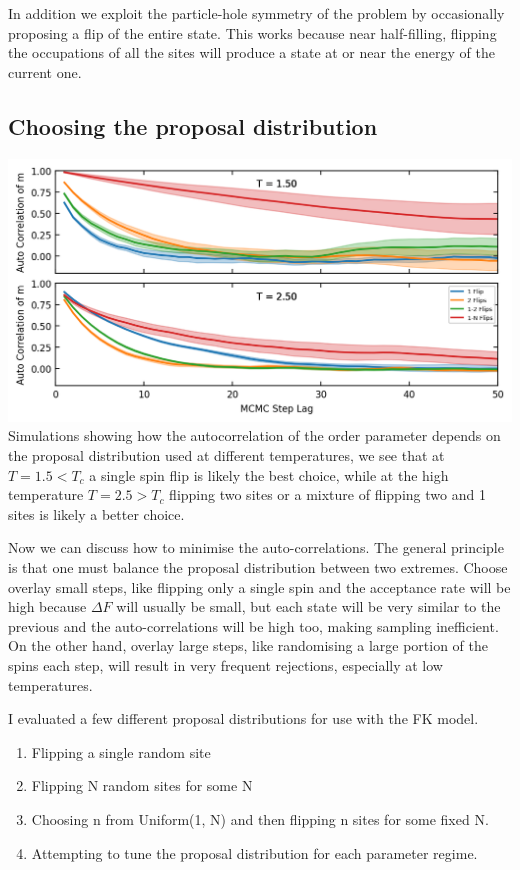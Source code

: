 In addition we exploit the particle-hole symmetry of the problem by occasionally proposing a flip of the entire state. This works because near half-filling, flipping the occupations of all the sites will produce a state at or near the energy of the current one.

\hypertarget{choosing-the-proposal-distribution}{%
\subsection{Choosing the proposal distribution}\label{choosing-the-proposal-distribution}}

\includegraphics{figs/lsr/autocorr_multiple_proposals.png} Simulations showing how the autocorrelation of the order parameter depends on the proposal distribution used at different temperatures, we see that at \(T = 1.5 < T_c\) a single spin flip is likely the best choice, while at the high temperature \(T = 2.5 > T_c\) flipping two sites or a mixture of flipping two and 1 sites is likely a better choice.

Now we can discuss how to minimise the auto-correlations. The general principle is that one must balance the proposal distribution between two extremes. Choose overlay small steps, like flipping only a single spin and the acceptance rate will be high because \(\Delta F\) will usually be small, but each state will be very similar to the previous and the auto-correlations will be high too, making sampling inefficient. On the other hand, overlay large steps, like randomising a large portion of the spins each step, will result in very frequent rejections, especially at low temperatures.

I evaluated a few different proposal distributions for use with the FK model.

\begin{enumerate}
\def\labelenumi{\arabic{enumi}.}
\item
  Flipping a single random site
\item
  Flipping N random sites for some N
\item
  Choosing n from Uniform(1, N) and then flipping n sites for some fixed N.
\item
  Attempting to tune the proposal distribution for each parameter regime.
\end{enumerate}

